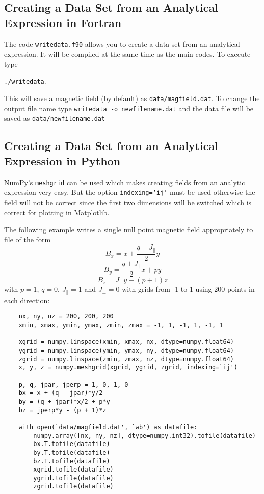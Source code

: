 \documentclass[12pt]{article}
\begin{document}
    \subsection{Creating a Data Set from an Analytical Expression in Fortran}
      \label{sec:writedata}

      The code \texttt{writedata.f90} allows you to create a data set from an analytical expression. It will be compiled at the same time as the main codes. To execute type

      \texttt{./writedata}.

      This will save a magnetic field (by default) as \texttt{data/magfield.dat}. To change the output file name type \texttt{writedata -o newfilename.dat} and the data file will be saved as \texttt{data/newfilename.dat}
    
    \subsection{Creating a Data Set from an Analytical Expression in Python}
      \label{sec:pythonanal}

      NumPy's \texttt{meshgrid} can be used which makes creating fields from an analytic expression very easy. But the option \texttt{indexing=`ij'} must be used otherwise the field will not be correct since the first two dimensions will be switched which is correct for plotting in Matplotlib.

      The following example writes a single null point magnetic field appropriately to file of the form
        \[ B_x = x + \frac{q - J_\parallel}{2} y \]
        \[ B_y = \frac{q + J_\parallel}{2} x + p y \]
        \[ B_z = J_\perp y - (p + 1) z \]
      with \( p = 1 \), \( q = 0 \), \( J_\parallel = 1 \) and \( J_\perp = 0 \) with grids from -1 to 1 using 200 points in each direction:

      \begin{verbatim}
    nx, ny, nz = 200, 200, 200
    xmin, xmax, ymin, ymax, zmin, zmax = -1, 1, -1, 1, -1, 1

    xgrid = numpy.linspace(xmin, xmax, nx, dtype=numpy.float64)
    ygrid = numpy.linspace(ymin, ymax, ny, dtype=numpy.float64)
    zgrid = numpy.linspace(zmin, zmax, nz, dtype=numpy.float64)
    x, y, z = numpy.meshgrid(xgrid, ygrid, zgrid, indexing=`ij')

    p, q, jpar, jperp = 1, 0, 1, 0
    bx = x + (q - jpar)*y/2
    by = (q + jpar)*x/2 + p*y
    bz = jperp*y - (p + 1)*z

    with open(`data/magfield.dat', `wb') as datafile:
        numpy.array([nx, ny, nz], dtype=numpy.int32).tofile(datafile)
        bx.T.tofile(datafile)
        by.T.tofile(datafile)
        bz.T.tofile(datafile)
        xgrid.tofile(datafile)
        ygrid.tofile(datafile)
        zgrid.tofile(datafile)
      \end{verbatim}
\end{document}
